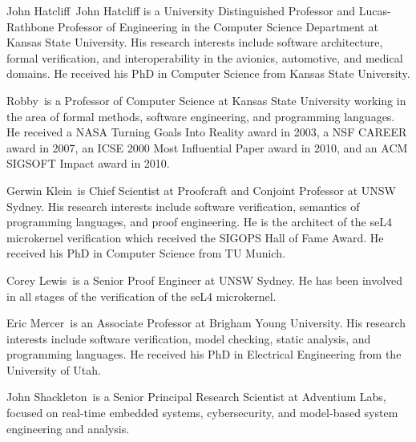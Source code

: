 \begin{IEEEbiography}{John Hatcliff}{\,}
John Hatcliff is a University Distinguished Professor and
Lucas-Rathbone Professor of Engineering in the Computer Science
Department at Kansas State University.  His research interests include
software architecture, formal verification, and interoperability in 
the avionics, automotive, and medical domains.
He received his PhD in Computer Science from Kansas State University.
\end{IEEEbiography}

\begin{IEEEbiography}{Robby}{\,}
is a Professor of Computer Science at Kansas State University working
in the area of formal methods, software engineering, and programming
languages.
He received a NASA Turning Goals Into Reality award in 2003,
a NSF CAREER award in 2007, an ICSE 2000 Most Influential Paper award in 2010,
and an ACM SIGSOFT Impact award in 2010.
\end{IEEEbiography}

\begin{IEEEbiography}{Gerwin Klein}{\,}
is Chief Scientist at Proofcraft and Conjoint Professor at UNSW Sydney. His
research interests include software verification, semantics of programming
languages, and proof engineering. He is the architect of the seL4 microkernel
verification which received the SIGOPS Hall of Fame Award. He received his PhD
in Computer Science from TU Munich.
\end{IEEEbiography}

\begin{IEEEbiography}{Corey Lewis}{\,}%
  is a Senior Proof Engineer at UNSW Sydney. He has been involved in all stages
  of the verification of the seL4 microkernel.
\end{IEEEbiography}

\begin{IEEEbiography}{Eric Mercer}{\,}
  is an Associate Professor at Brigham Young University.
  His research interests include software verification, model checking, static analysis, and programming languages.
  He received his PhD in Electrical Engineering from the University of Utah.
\end{IEEEbiography}

\begin{IEEEbiography}{John Shackleton}{\,}
  is a Senior Principal Research Scientist at Adventium Labs,
  focused on real-time embedded systems, cybersecurity, and
  model-based system engineering and analysis.
\end{IEEEbiography}

